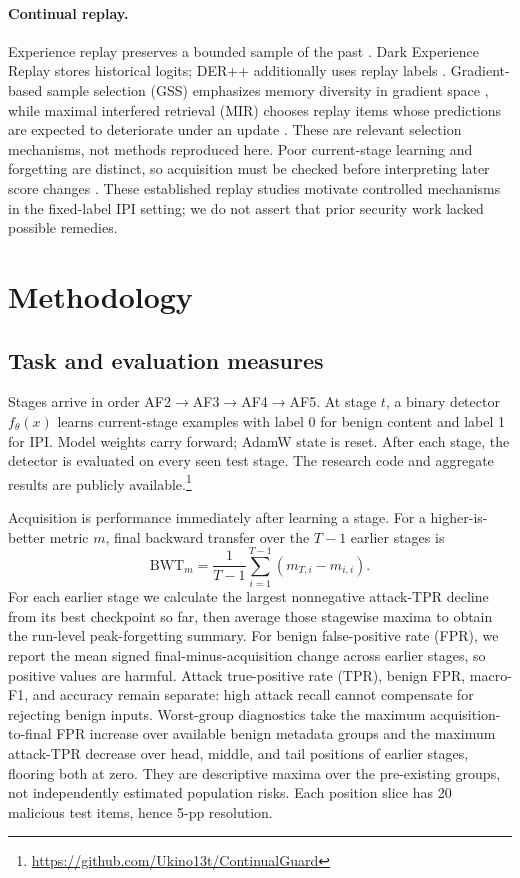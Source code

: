 \documentclass[conference]{IEEEtran}
\newcommand{\af}[1]{\textsc{AF#1}}
\begin{document}
\paragraph{Continual replay.}
Experience replay preserves a bounded sample of the past \cite{rolnick2019experience,buzzega2020rethinking}. Dark Experience Replay stores historical logits; DER++ additionally uses replay labels \cite{buzzega2020dark}. Gradient-based sample selection (GSS) emphasizes memory diversity in gradient space \cite{aljundi2019gradient}, while maximal interfered retrieval (MIR) chooses replay items whose predictions are expected to deteriorate under an update \cite{aljundi2019mir}. These are relevant selection mechanisms, not methods reproduced here. Poor current-stage learning and forgetting are distinct, so acquisition must be checked before interpreting later score changes \cite{elsayed2024plasticity}. These established replay studies motivate controlled mechanisms in the fixed-label IPI setting; we do not assert that prior security work lacked possible remedies.

\section{Methodology}
\subsection{Task and evaluation measures}
Stages arrive in order \af{2}$\rightarrow$\af{3}$\rightarrow$\af{4}$\rightarrow$\af{5}. At stage $t$, a binary detector $f_\theta(x)$ learns current-stage examples with label 0 for benign content and label 1 for IPI. Model weights carry forward; AdamW state is reset. After each stage, the detector is evaluated on every seen test stage. The research code and aggregate results are publicly available.\footnote{\url{https://github.com/Ukino13t/ContinualGuard}}

Acquisition is performance immediately after learning a stage. For a higher-is-better metric $m$, final backward transfer over the $T-1$ earlier stages is
\begin{equation}
\mathrm{BWT}_m=\frac{1}{T-1}\sum_{i=1}^{T-1}\left(m_{T,i}-m_{i,i}\right).
\end{equation}
For each earlier stage we calculate the largest nonnegative attack-TPR decline from its best checkpoint so far, then average those stagewise maxima to obtain the run-level peak-forgetting summary. For benign false-positive rate (FPR), we report the mean signed final-minus-acquisition change across earlier stages, so positive values are harmful. Attack true-positive rate (TPR), benign FPR, macro-F1, and accuracy remain separate: high attack recall cannot compensate for rejecting benign inputs.
Worst-group diagnostics take the maximum acquisition-to-final FPR increase over available benign metadata groups and the maximum attack-TPR decrease over head, middle, and tail positions of earlier stages, flooring both at zero. They are descriptive maxima over the pre-existing groups, not independently estimated population risks. Each position slice has 20 malicious test items, hence 5-pp resolution.
\end{document}
